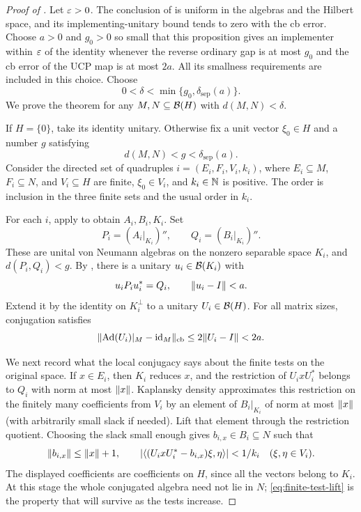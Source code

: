 \begin{proof}[Proof of ]
Let $\varepsilon>0$.  The conclusion of  is uniform in the
algebras and the Hilbert space, and its implementing-unitary bound
tends to zero with the cb error.  Choose $a>0$ and $g_0>0$ so small
that this proposition gives an implementer within $\varepsilon$ of the
identity whenever the reverse ordinary gap is at most $g_0$ and the
cb error of the UCP map is at most $2a$.  All its smallness
requirements are included in this choice.  Choose
\[
 0<\delta<\min\{g_0,\delta_{\mathrm{sep}}(a)\}.
\]
We prove the theorem for any $M,N\subseteq\mathcal B(H)$ with
$d(M,N)<\delta$.

If $H=\{0\}$, take its identity unitary.  Otherwise fix a unit
vector $\xi_0\in H$ and a number $g$ satisfying
\[
 d(M,N)<g<\delta_{\mathrm{sep}}(a).
\]
Consider the directed set of quadruples
$i=(E_i,F_i,V_i,k_i)$, where $E_i\subseteq M$, $F_i\subseteq N$,
and $V_i\subseteq H$ are finite, $\xi_0\in V_i$, and
$k_i\in\mathbb N$ is positive.  The order is inclusion in the three finite
sets and the usual order in $k_i$.

For each $i$, apply  to obtain
$A_i,B_i,K_i$.  Set
\[
 P_i=(A_i|_{K_i})'',\qquad Q_i=(B_i|_{K_i})''.
\]
These are unital von Neumann algebras on the nonzero separable space
$K_i$, and $d(P_i,Q_i)<g$.  By , there
is a unitary $u_i\in\mathcal B(K_i)$ with
\[
 u_iP_iu_i^*=Q_i,\qquad\lVert u_i-I\rVert<a.
\]
Extend it by the identity on $K_i^\perp$ to a unitary $U_i\in\mathcal B(H)$.
For all matrix sizes, conjugation satisfies
\begin{equation}\label{eq:finite-test-cb}
 \lVert\operatorname{Ad}(U_i)|_M-\operatorname{id}_M\rVert_{\mathrm{cb}}\leq2\lVert U_i-I\rVert<2a.
\end{equation}

We next record what the local conjugacy says about the finite tests
on the original space.  If $x\in E_i$, then $K_i$ reduces $x$, and
the restriction of $U_ixU_i^*$ belongs to $Q_i$ with norm at most
$\lVert x\rVert$.  Kaplansky density approximates this restriction on
the finitely many coefficients from $V_i$ by an element of $B_i|_{K_i}$
of norm at most $\lVert x\rVert$ (with arbitrarily small slack if needed).
Lift that element through the restriction quotient.  Choosing the
slack small enough gives $b_{i,x}\in B_i\subseteq N$ such that
\begin{equation}\label{eq:finite-test-lift}
 \lVert b_{i,x}\rVert\leq\lVert x\rVert+1,
 \qquad
 \lvert\langle (U_ixU_i^*-b_{i,x})\xi,\eta\rangle\rvert<1/k_i
 \quad(\xi,\eta\in V_i).
\end{equation}
The displayed coefficients are coefficients on $H$, since all
the vectors belong to $K_i$.  At this stage the whole conjugated
algebra need not lie in $N$; \eqref{eq:finite-test-lift} is the
property that will survive as the tests increase.


\end{proof}
